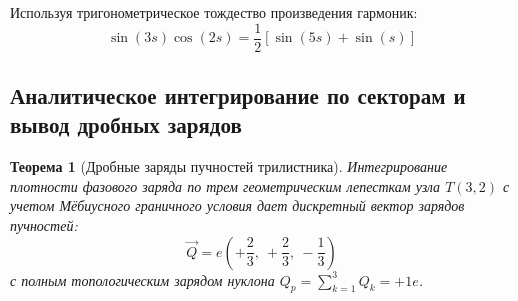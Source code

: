 \documentclass[12pt,a4paper]{article}
\newtheorem{theorem}{Теорема}
\begin{document}
Используя тригонометрическое тождество произведения гармоник:
\begin{equation}
	\sin(3s) \cos(2s) = \frac{1}{2} \left[ \sin(5s) + \sin(s) \right]
\end{equation}

\subsection{Аналитическое интегрирование по секторам и вывод дробных зарядов}
\begin{theorem}[Дробные заряды пучностей трилистника]
	Интегрирование плотности фазового заряда по трем геометрическим лепесткам узла $T(3,2)$ с учетом Мёбиусного граничного условия дает дискретный вектор зарядов пучностей:
	\begin{equation}
		\vec{Q} = e \left( +\frac{2}{3}, \ +\frac{2}{3}, \ -\frac{1}{3} \right)
	\end{equation}
	с полным топологическим зарядом нуклона $Q_p = \sum_{k=1}^3 Q_k = +1e$.
\end{theorem}
\end{document}
